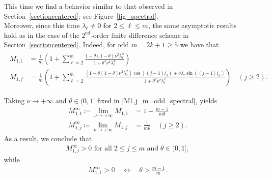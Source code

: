 \documentclass[smallextended,numbook,runningheads]{svjour3}     %
\newcommand{\te}{\theta}
\begin{document}
\begin{description}[style=unboxed,leftmargin=0cm]
\item [{Case 2:} $m$ is {odd}.]
This time we find a behavior similar to that observed in Section~\ref{sectioncentered}; see
Figure~\ref{fig_spectral}. \\
Moreover, since this time $\lambda_\ell\ne 0$ for $2\le\ell\le m$, the same asymptotic results hold as in the case of the
$2^\text{nd}$-order finite difference scheme in Section~\ref{sectioncentered}. Indeed, 
for odd $m = 2k+1 \ge 5$ we have that
\begin{align}\label{M1,j_m=odd_spectral}
	\begin{split}
		M_{1,1} & = \frac{1}{m} \left(1 + \sum_{\ell=2}^{m} \frac{1-\theta(1-\theta)\nu^2\lambda^2_\ell}
			{1+\theta^2\nu^2\lambda^2_\ell}\right) \\
		M_{1,j} & = \frac{1}{m} \left(1 + \sum_{\ell=2}^{m} \frac{(1-\theta(1-\theta)\nu^2\lambda^2_\ell)
			\cos((j-1)\xi_\ell) + \nu \lambda_\ell\sin((j-1)\xi_\ell)}{1+\theta^2\nu^2\lambda^2_\ell}
			\right) \quad (j\ge 2).
	\end{split}
\end{align}

Taking $\nu \to +\infty$ and $\te \in (0,1]$ fixed in \eqref{M1,j_m=odd_spectral}, yields
\begin{align*}
    M_{1,1}^\infty \coloneqq \lim_{\nu \to +\infty} M_{1,1} & =  1-\frac{m-1}{m\theta} \\
    M_{1,j}^\infty \coloneqq \lim_{\nu \to +\infty} M_{1,j} & = \frac{1}{m\theta} \quad (j \ge 2).
\end{align*}
As a result, %
we conclude that
\begin{align*}
	M_{1,j}^\infty > 0 \text{ for all } 2\le j\le m \text{ and } \te \in (0,1],
\end{align*}
while
\begin{align*}
	M_{1,1}^\infty > 0 \quad\Longleftrightarrow \quad \theta > \frac{m-1}{m}.
\end{align*}
\end{description}
\end{document}
